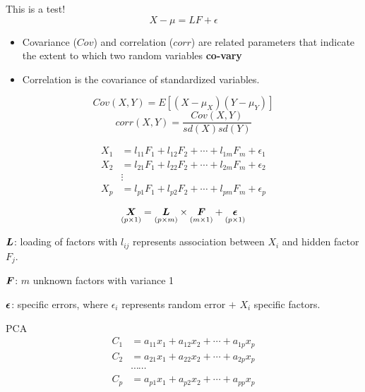 This is a test!
\begin{equation*}
X - \mu = L F + \epsilon
\end{equation*}
\Large
\begin{itemize}
\item Covariance ($Cov$) and correlation ($corr$) are related parameters that indicate the extent to which two random variables \textbf{co-vary}
\item Correlation is the covariance of standardized variables.  
\end{itemize}
\begin{equation*}
Cov(X, Y) = E[(X-\mu_X)(Y-\mu_Y)]
\end{equation*}
\begin{equation*}
corr(X, Y) =  \frac{Cov(X, Y)}{sd(X) sd(Y)}
\end{equation*}

\begin{align*}
X_1 &= l_{11} F_1 + l_{12}F_2 + \cdots + l_{1m}F_m + \epsilon_{1} \\
X_2 &= l_{21} F_1 + l_{22}F_2 + \cdots + l_{2m}F_m + \epsilon_{2} \\
&\vdots  \\
X_p &= l_{p1} F_1 + l_{p2}F_2 + \cdots + l_{pm}F_m + \epsilon_{p} 
\end{align*}

\begin{equation*}
\underset{(p\times 1)}{\bm X} = \underset{(p\times m)}{\bm L} \times \underset{(m \times 1)}{\bm F} + \underset{(p \times 1)}{\bm \epsilon}
\end{equation*}

$\bm L$: loading of factors with $l_{ij}$ represents association between $X_i$ and hidden factor $F_j$.

$\bm F$: $m$ unknown factors with variance 1

$\bm \epsilon$: specific errors, where $\epsilon_i$ represents random error $+$ $X_i$ specific factors.


PCA
\begin{align*}
 C_1 &= a_{11}x_1 + a_{12}x_2 + \cdots + a_{1p}x_p\\
 C_2 &= a_{21}x_1 + a_{22}x_2 + \cdots + a_{2p}x_p\\
  & \cdots\cdots \\
 C_p &= a_{p1}x_1 + a_{p2}x_2 + \cdots + a_{pp}x_p\\
\end{align*}

